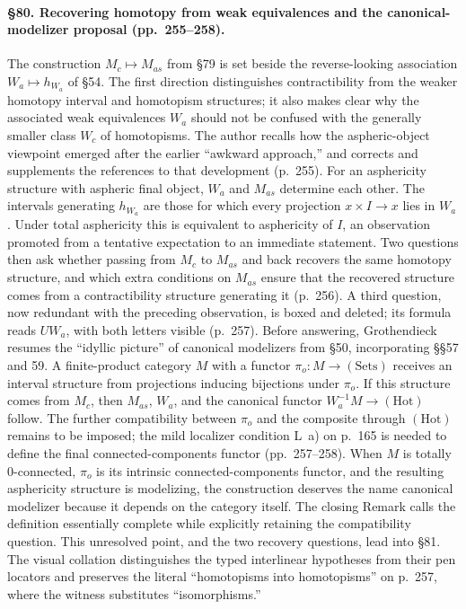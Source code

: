 


\paragraph{\S80. Recovering homotopy from weak equivalences and the canonical-modelizer proposal (pp.\ 255--258).}
The construction $M_c\mapsto M_{as}$ from \S79 is set beside the reverse-looking association $W_a\mapsto h_{W_a}$ of \S54. The first direction distinguishes contractibility from the weaker homotopy interval and homotopism structures; it also makes clear why the associated weak equivalences $W_a$ should not be confused with the generally smaller class $W_c$ of homotopisms. The author recalls how the aspheric-object viewpoint emerged after the earlier “awkward approach,” and corrects and supplements the references to that development (p.\ 255). For an asphericity structure with aspheric final object, $W_a$ and $M_{as}$ determine each other. The intervals generating $h_{W_a}$ are those for which every projection $x\times I\to x$ lies in $W_a$. Under total asphericity this is equivalent to asphericity of $I$, an observation promoted from a tentative expectation to an immediate statement. Two questions then ask whether passing from $M_c$ to $M_{as}$ and back recovers the same homotopy structure, and which extra conditions on $M_{as}$ ensure that the recovered structure comes from a contractibility structure generating it (p.\ 256). A third question, now redundant with the preceding observation, is boxed and deleted; its formula reads $UW_a$, with both letters visible (p.\ 257). Before answering, Grothendieck resumes the “idyllic picture” of canonical modelizers from \S50, incorporating \S\S57 and 59. A finite-product category $M$ with a functor $\pi_o:M\to(\mathrm{Sets})$ receives an interval structure from projections inducing bijections under $\pi_o$. If this structure comes from $M_c$, then $M_{as}$, $W_a$, and the canonical functor $W_a^{-1}M\to(\mathrm{Hot})$ follow. The further compatibility between $\pi_o$ and the composite through $(\mathrm{Hot})$ remains to be imposed; the mild localizer condition L~a) on p.\ 165 is needed to define the final connected-components functor (pp.\ 257--258). When $M$ is totally 0-connected, $\pi_o$ is its intrinsic connected-components functor, and the resulting asphericity structure is modelizing, the construction deserves the name canonical modelizer because it depends on the category itself. The closing Remark calls the definition essentially complete while explicitly retaining the compatibility question. This unresolved point, and the two recovery questions, lead into \S81. The visual collation distinguishes the typed interlinear hypotheses from their pen locators and preserves the literal “homotopisms into homotopisms” on p.\ 257, where the witness substitutes “isomorphisms.”





